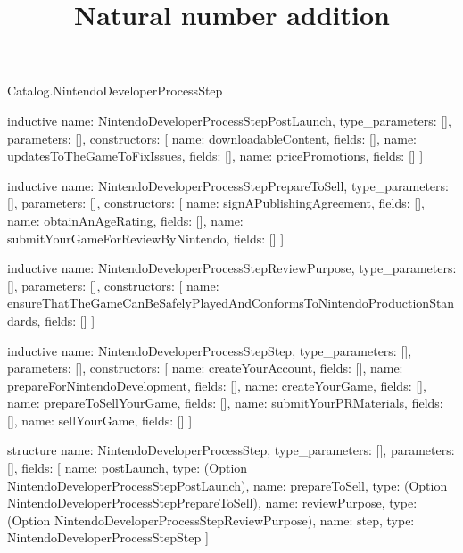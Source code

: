 \begin{lexlean}{Catalog.NintendoDeveloperProcessStep}
\title{Natural number addition}
\begin{semanticmodule}
inductive{
  name: NintendoDeveloperProcessStepPostLaunch,
  type_parameters: [],
  parameters: [],
  constructors: [
    {name: downloadableContent, fields: []},
    {name: updatesToTheGameToFixIssues, fields: []},
    {name: pricePromotions, fields: []}
  ]
}

inductive{
  name: NintendoDeveloperProcessStepPrepareToSell,
  type_parameters: [],
  parameters: [],
  constructors: [
    {name: signAPublishingAgreement, fields: []},
    {name: obtainAnAgeRating, fields: []},
    {name: submitYourGameForReviewByNintendo, fields: []}
  ]
}

inductive{
  name: NintendoDeveloperProcessStepReviewPurpose,
  type_parameters: [],
  parameters: [],
  constructors: [
    {name: ensureThatTheGameCanBeSafelyPlayedAndConformsToNintendoProductionStandards, fields: []}
  ]
}

inductive{
  name: NintendoDeveloperProcessStepStep,
  type_parameters: [],
  parameters: [],
  constructors: [
    {name: createYourAccount, fields: []},
    {name: prepareForNintendoDevelopment, fields: []},
    {name: createYourGame, fields: []},
    {name: prepareToSellYourGame, fields: []},
    {name: submitYourPRMaterials, fields: []},
    {name: sellYourGame, fields: []}
  ]
}

structure{
  name: NintendoDeveloperProcessStep,
  type_parameters: [],
  parameters: [],
  fields: [
    {name: postLaunch, type: (Option NintendoDeveloperProcessStepPostLaunch)},
    {name: prepareToSell, type: (Option NintendoDeveloperProcessStepPrepareToSell)},
    {name: reviewPurpose, type: (Option NintendoDeveloperProcessStepReviewPurpose)},
    {name: step, type: NintendoDeveloperProcessStepStep}
  ]
}
\end{semanticmodule}
\end{lexlean}
